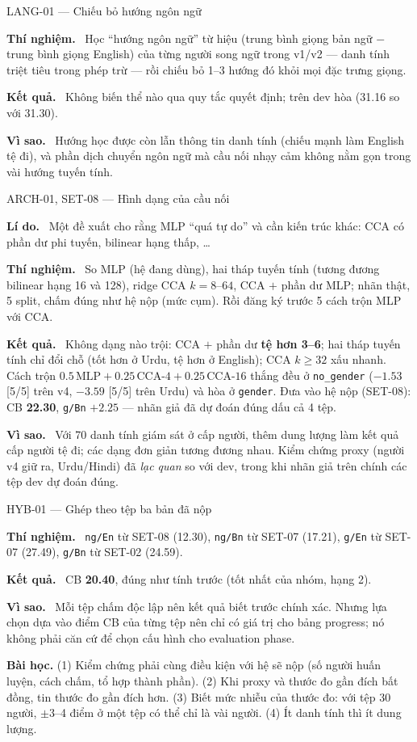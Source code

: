 \documentclass[11pt,a4paper,oneside]{report}
\newcommand{\up}[1]{\textbf{\color{good}#1}}
\newcommand{\down}[1]{\textbf{\color{bad}#1}}
\newcommand{\id}[1]{\texttt{#1}}
\newcommand{\field}[1]{\par\smallskip\textbf{\color{accent}#1.}~}
\begin{document}
\begin{expbox}{LANG-01 --- Chiếu bỏ hướng ngôn ngữ}
\field{Thí nghiệm} Học ``hướng ngôn ngữ'' từ hiệu (trung bình giọng bản ngữ $-$ trung bình giọng English) của từng người song ngữ trong v1/v2 --- danh tính triệt tiêu trong phép trừ --- rồi chiếu bỏ 1--3 hướng đó khỏi mọi đặc trưng giọng.
\field{Kết quả} Không biến thể nào qua quy tắc quyết định; trên dev hòa (31.16 so với 31.30).
\field{Vì sao} Hướng học được còn lẫn thông tin danh tính (chiếu mạnh làm English tệ đi), và phần dịch chuyển ngôn ngữ mà cầu nối nhạy cảm không nằm gọn trong vài hướng tuyến tính.
\end{expbox}

\begin{expbox}{ARCH-01, SET-08 --- Hình dạng của cầu nối}
\field{Lí do} Một đề xuất cho rằng MLP ``quá tự do'' và cần kiến trúc khác: CCA có phần dư phi tuyến, bilinear hạng thấp, \dots
\field{Thí nghiệm} So MLP (hệ đang dùng), hai tháp tuyến tính (tương đương bilinear hạng 16 và 128), ridge CCA $k=8$--$64$, CCA $+$ phần dư MLP; nhãn thật, 5 split, chấm đúng như hệ nộp (mức cụm). Rồi đăng ký trước 5 cách trộn MLP với CCA.
\field{Kết quả} Không dạng nào trội: CCA $+$ phần dư \down{tệ hơn 3--6}; hai tháp tuyến tính chỉ đổi chỗ (tốt hơn ở Urdu, tệ hơn ở English); CCA $k\ge32$ xấu nhanh. Cách trộn $0.5\,\text{MLP}+0.25\,\text{CCA-4}+0.25\,\text{CCA-16}$ thắng đều ở \id{no\_gender} ($-1.53$ [5/5] trên v4, $-3.59$ [5/5] trên Urdu) và hòa ở \id{gender}. Đưa vào hệ nộp (SET-08): CB \down{22.30}, \id{g/Bn} $+2.25$ --- nhãn giả đã dự đoán đúng dấu cả 4 tệp.
\field{Vì sao} Với 70 danh tính giám sát ở cấp người, thêm dung lượng làm kết quả cấp người tệ đi; các dạng đơn giản tương đương nhau. Kiểm chứng proxy (người v4 giữ ra, Urdu/Hindi) đã \emph{lạc quan} so với dev, trong khi nhãn giả trên chính các tệp dev dự đoán đúng.
\end{expbox}

\begin{expbox}{HYB-01 --- Ghép theo tệp ba bản đã nộp}
\field{Thí nghiệm} \id{ng/En} từ SET-08 (12.30), \id{ng/Bn} từ SET-07 (17.21), \id{g/En} từ SET-07 (27.49), \id{g/Bn} từ SET-02 (24.59).
\field{Kết quả} CB \up{20.40}, đúng như tính trước (tốt nhất của nhóm, hạng 2).
\field{Vì sao} Mỗi tệp chấm độc lập nên kết quả biết trước chính xác. Nhưng lựa chọn dựa vào điểm CB của từng tệp nên chỉ có giá trị cho bảng progress; nó không phải căn cứ để chọn cấu hình cho evaluation phase.
\end{expbox}

\begin{lesson}
\textbf{Bài học.} (1) Kiểm chứng phải cùng điều kiện với hệ sẽ nộp (số người huấn luyện, cách chấm, tổ hợp thành phần). (2) Khi proxy và thước đo gần đích bất đồng, tin thước đo gần đích hơn. (3) Biết mức nhiễu của thước đo: với tệp 30 người, $\pm3$--4 điểm ở một tệp có thể chỉ là vài người. (4) Ít danh tính thì ít dung lượng.
\end{lesson}
\end{document}
